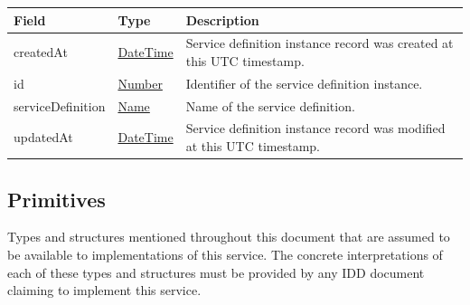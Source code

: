 \documentclass[a4paper]{arrowhead}
\newcommand{\pref}[1]{{\textcolor{ArrowheadGrey}{\hyperref[sec:model:primitives:#1]{#1}}}}
\begin{document}
\label{sec:model:ServiceDefinitionRecord}

\begin{table}[ht!]
\begin{tabularx}{\textwidth}{| p{4.25cm} | p{3.5cm} | X |} \hline
\rowcolor{gray!33} Field & Type & Description \\ \hline
createdAt & \pref{DateTime} & Service definition instance record was created at this UTC time\-stamp. \\ \hline
id & \pref{Number} & Identifier of the service definition instance. \\ \hline
serviceDefinition &\pref{Name}  & Name of the service definition. \\ \hline
updatedAt & \pref{DateTime} & Service definition instance record was modified at this UTC time\-stamp. \\ \hline
\end{tabularx}
\end{table}

\clearpage

\subsection{Primitives}
\label{sec:model:primitives}

Types and structures mentioned throughout this document that are assumed to be available to implementations of this service.
The concrete interpretations of each of these types and structures must be provided by any IDD document claiming to implement this service.
\end{document}
